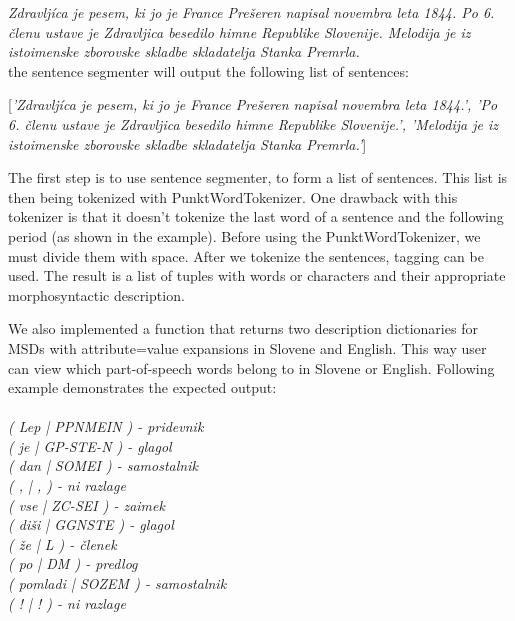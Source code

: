 \documentclass[10pt, conference, compsocconf]{IEEEtran}
\begin{document}
\begin{itemize}
\textit{Zdravljíca je pesem, ki jo je France Prešeren napisal novembra leta 1844. Po 6. členu ustave je Zdravljica besedilo himne Republike Slovenije. Melodija je iz istoimenske zborovske skladbe skladatelja Stanka Premrla.}\\

the sentence segmenter will output the following list of sentences:

[\textit{'Zdravljíca je pesem, ki jo je France Prešeren napisal novembra leta 1844.', 'Po 6. členu ustave je Zdravljica besedilo himne Republike Slovenije.', 'Melodija je iz istoimenske zborovske skladbe skladatelja Stanka Premrla.'}]
\end{itemize} 


The first step is to use sentence segmenter, to form a list of sentences. This list is then being tokenized with PunktWordTokenizer. One drawback with this tokenizer is that it doesn't tokenize the last word of a sentence and the following period (as shown in the example). Before using the PunktWordTokenizer, we must divide them with space. After we tokenize the sentences, tagging can be used. The result is a list of tuples with words or characters and their appropriate morphosyntactic description. 

We also implemented a function that returns two description dictionaries for MSDs with attribute=value expansions in Slovene and English. This way user can view which part-of-speech words belong to in Slovene or English. Following example demonstrates the expected output:
\\\\
\textit{( Lep  |  PPNMEIN ) - pridevnik \\
	( je  |  GP-STE-N ) - glagol\\
	( dan  |  SOMEI ) - samostalnik\\
	( ,  |  , ) - ni razlage\\
	( vse  |  ZC-SEI ) - zaimek\\
	( diši  |  GGNSTE ) - glagol\\
	( že  |  L ) - členek\\
	( po  |  DM ) - predlog\\
	( pomladi  |  SOZEM ) - samostalnik\\
	( !  |  ! ) - ni razlage}\\
\end{document}
